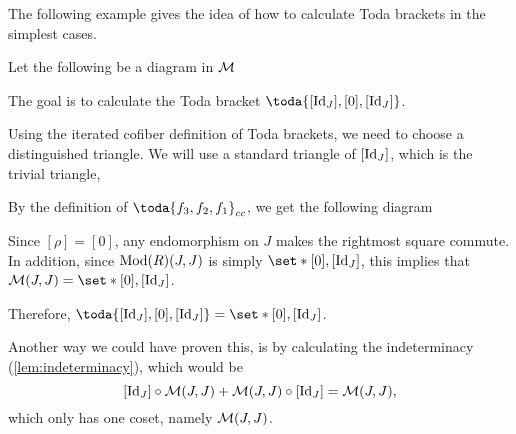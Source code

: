 The following example gives the idea of how to calculate Toda brackets in the simplest cases.

\begin{example}
	\label{ex:toda_bracket_1}
	Let the following be a diagram in \( {\mathcal{M}} \)
	\begin{center}
	\end{center}
	
	The goal is to calculate the Toda bracket \( \toda{[\Id_J], [0], [\Id_J]} \).

	Using the iterated cofiber definition of Toda brackets, we need to choose a distinguished triangle. We will use a standard triangle of \( [\operatorname{Id}_J] \), which is the trivial triangle,
	\begin{center}
	\end{center}

	By the definition of \( \toda{f_3, f_2, f_1}_{cc} \), we get the following diagram
	\begin{center}
	\end{center}

	Since \( [\rho] = [0] \), any endomorphism on \( J \) makes the rightmost square commute. In addition, since \( \operatorname{Mod}(R)(J, J) \) is simply \( \set*{[0], [\Id_J]} \), this implies that \( \Mc(J, J) = \set*{[0], [\Id_J]} \).

	Therefore, \( \toda{[\Id_J], [0], [\Id_J]} = \set*{[0], [\Id_J]} \).

	Another way we could have proven this, is by calculating the indeterminacy (\autoref{lem:indeterminacy}), which would be
	\[
		[\operatorname{Id}_J] \circ {\mathcal{M}}(J, J) + {\mathcal{M}}(J, J) \circ [\operatorname{Id}_J] = {\mathcal{M}}(J, J),
	\]
	which only has one coset, namely \( {\mathcal{M}}(J, J) \).
\end{example}

